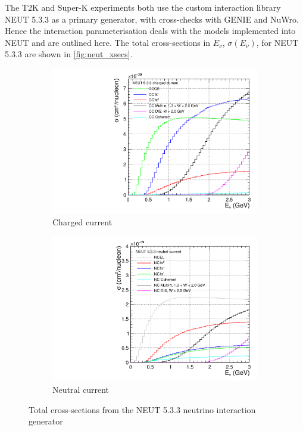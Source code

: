The T2K and Super-K experiments both use the custom interaction library NEUT 5.3.3\cite{neut} as a primary generator, with cross-checks with GENIE\cite{genie} and NuWro\cite{NuWro}. Hence the interaction parameterisation deals with the models implemented into NEUT and are outlined here. The total cross-sections in $E_\nu$, $\sigma(E_\nu)$, for NEUT 5.3.3 are shown in \autoref{fig:neut_xsecs}.
\begin{figure}[h]
	\centering
	\begin{subfigure}[t]{0.42\textwidth}
		\includegraphics[width=\textwidth, trim={0mm 0mm 0mm 0mm}, clip,page=1]{figures/niwg/NEUT_533_xsecs}
		\caption{Charged current}
	\end{subfigure}
	\begin{subfigure}[t]{0.42\textwidth}
		\includegraphics[width=\textwidth, trim={0mm 0mm 0mm 0mm}, clip,page=1]{figures/niwg/NEUT_533_xsecs_NC}
		\caption{Neutral current}
	\end{subfigure}
	\caption{Total cross-sections from the NEUT 5.3.3\cite{neut} neutrino interaction generator}
	\label{fig:neut_xsecs}
\end{figure}

